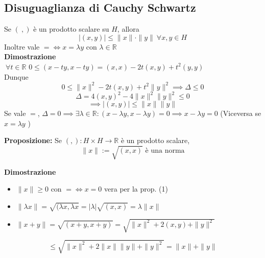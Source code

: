 \documentclass[a4paper]{article}
\newcommand{\R}{\mathbb{R}}
\begin{document}
\subsection{Disuguaglianza di Cauchy Schwartz}
Se $(\ ,)$ è un prodotto scalare su $H$, allora
\[|(x,y)|\le \|x\|\cdot \|y\|\ \forall x,y\in H\]
Inoltre vale $=\iff x=\lambda y$ con $\lambda \in \R$
\\\textbf{Dimostrazione} 
\\$\ \forall t\in \R$ $0\le (x-ty,x-ty)=(x,x)-2t(x,y)+t^2(y,y)$
\\Dunque
\[0\le \|x\|^2-2t(x,y)+t^2\|y\|^2\implies \Delta\le 0\]
\[\Delta = 4(x,y)^2-4\|x\|^2\|y\|^2\le 0\]
\[\implies |(x,y)|\le \|x\|\|y\|\]
Se vale $=$, $\Delta = 0\implies \exists \lambda\in \R:(x-\lambda y,x-\lambda y)=0\implies x-\lambda y=0$
(Viceversa se $x=\lambda y$ )
\begin{tcolorbox}
	\textbf{Proposizione:} Se $(,):H\times H\to \R$ è un prodotto scalare,
	\[\|x\|:=\sqrt{(x,x)} \text{ è una norma}\]

\end{tcolorbox}
\textbf{Dimostrazione} 
\begin{itemize}
	\item $\|x\|\ge 0$ con $=\iff x=0$ vera per la prop. (1)
	\item $\|\lambda x\|=\sqrt{(\lambda x,\lambda x} =|\lambda|\sqrt{(x,x)} =\lambda \|x\|$
	\item $\|x+y\|=\sqrt{(x+y,x+y)} =\sqrt{\|x\|^2+2(x,y)+\|y\|^2} $
\end{itemize}
\[\le \sqrt{\|x\|^2+2\|x\| \|y\|+\|y\|^2} =\|x\|+\|y\|\]
\end{document}
